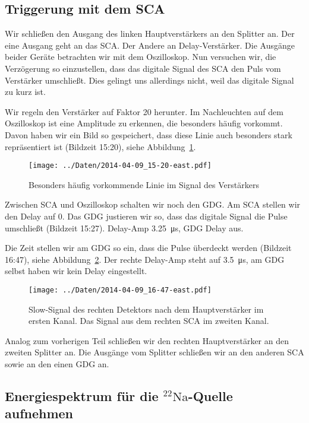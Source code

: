 \subsection{Triggerung mit dem SCA}

Wir schließen den Ausgang des linken Hauptverstärkers an den Splitter an. Der
eine Ausgang geht an das SCA. Der Andere an Delay-Verstärker. Die Ausgänge
beider Geräte betrachten wir mit dem Oszilloskop. Nun versuchen wir, die
Verzögerung so einzustellen, dass das digitale Signal des SCA den Puls vom
Verstärker umschließt. Dies gelingt uns allerdings nicht, weil das digitale
Signal zu kurz ist.

Wir regeln den Verstärker auf Faktor 20 herunter. Im Nachleuchten auf dem
Oszilloskop ist eine Amplitude zu erkennen, die besonders häufig vorkommt. Davon
haben wir ein Bild so gespeichert, dass diese Linie auch besonders stark
repräsentiert ist (Bildzeit 15:20), siehe Abbildung~\ref{fig:511}.

\begin{figure}[htbp]
    \centering
    \texttt{[image: ../Daten/2014-04-09\_15-20-east.pdf]}
    \caption{%
        Besonders häufig vorkommende Linie im Signal des Verstärkers
    }
    \label{fig:511}
\end{figure}

Zwischen SCA und Oszilloskop schalten wir noch den GDG. Am SCA stellen wir den Delay
auf 0. Das GDG justieren wir so, dass das digitale Signal die Pulse umschließt
(Bildzeit 15:27). Delay-Amp \SI{3.25}{\micro\second}, GDG Delay aus.

Die Zeit stellen wir am GDG so ein, dass die Pulse überdeckt werden (Bildzeit
16:47), siehe Abbildung~\ref{fig:sca_umschlossen}. Der rechte Delay-Amp steht
auf \SI{3.5}{\micro\second}, am GDG selbst haben wir kein Delay eingestellt.

\begin{figure}[htbp]
    \centering
    \texttt{[image: ../Daten/2014-04-09\_16-47-east.pdf]}
    \hfill
    \caption{%
        Slow-Signal des rechten Detektors nach dem Hauptverstärker im ersten
        Kanal. Das Signal aus dem rechten SCA im zweiten Kanal.
    }
    \label{fig:sca_umschlossen}
\end{figure}

Analog zum vorherigen Teil schließen wir den rechten Hauptverstärker an den
zweiten Splitter an. Die Ausgänge vom Splitter schließen wir an den anderen SCA
sowie an den einen GDG an.

\subsection{Energiespektrum für die ${}^{22}\text{Na}$-Quelle aufnehmen}

